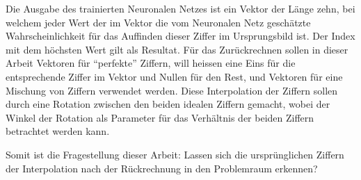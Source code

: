 \documentclass[Interploate_hadwritten_Digits.tex]{subfiles}
\begin{document}
	Die Ausgabe des trainierten Neuronalen Netzes ist ein Vektor der Länge zehn, bei welchem jeder Wert der im Vektor die vom Neuronalen Netz geschätzte Wahrscheinlichkeit für das Auffinden dieser Ziffer im Ursprungsbild ist. Der Index mit dem höchsten Wert gilt als Resultat. Für das Zurückrechnen sollen in dieser Arbeit Vektoren für ``perfekte'' Ziffern, will heissen eine Eins für die entsprechende Ziffer im Vektor und Nullen für den Rest, und Vektoren für eine Mischung von Ziffern verwendet werden. Diese Interpolation der Ziffern sollen durch eine Rotation zwischen den beiden idealen Ziffern gemacht, wobei der Winkel der Rotation als Parameter für das Verhältnis der beiden Ziffern betrachtet werden kann.
	\par
	Somit ist die Fragestellung dieser Arbeit: Lassen sich die ursprünglichen Ziffern der Interpolation nach der Rückrechnung in den Problemraum erkennen?
\end{document}
